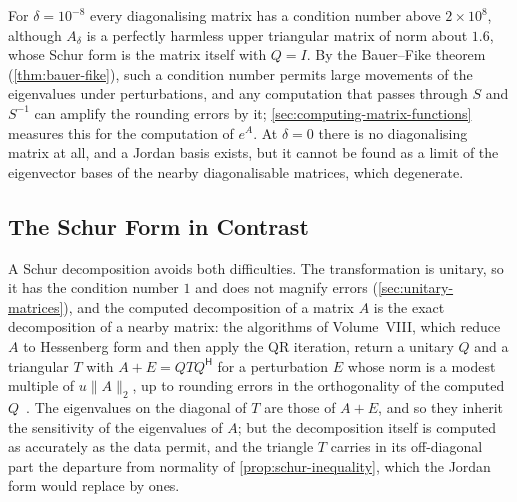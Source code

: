 For $\delta=10^{-8}$ every diagonalising matrix has a condition number above $2\times10^8$, although $A_\delta$ is a perfectly harmless upper triangular matrix of norm about $1.6$, whose Schur form is the matrix itself with $Q=I$. By the Bauer--Fike theorem (\cref{thm:bauer-fike}), such a condition number permits large movements of the eigenvalues under perturbations, and any computation that passes through $S$ and $S^{-1}$ can amplify the rounding errors by it; \cref{sec:computing-matrix-functions} measures this for the computation of $e^{A}$. At $\delta=0$ there is no diagonalising matrix at all, and a Jordan basis exists, but it cannot be found as a limit of the eigenvector bases of the nearby diagonalisable matrices, which degenerate.

\subsection{The Schur Form in Contrast}

A Schur decomposition avoids both difficulties. The transformation is unitary, so it has the condition number $1$ and does not magnify errors (\cref{sec:unitary-matrices}), and the computed decomposition of a matrix $A$ is the exact decomposition of a nearby matrix: the algorithms of Volume~VIII, which reduce $A$ to Hessenberg form and then apply the QR iteration, return a unitary $Q$ and a triangular $T$ with $A+E=QTQ^{\mathsf H}$ for a perturbation $E$ whose norm is a modest multiple of $u\|A\|_2$, up to rounding errors in the orthogonality of the computed $Q$~\cite[Sect.~7.5]{golub2013}. The eigenvalues on the diagonal of $T$ are those of $A+E$, and so they inherit the sensitivity of the eigenvalues of $A$; but the decomposition itself is computed as accurately as the data permit, and the triangle $T$ carries in its off-diagonal part the departure from normality of \cref{prop:schur-inequality}, which the Jordan form would replace by ones.

